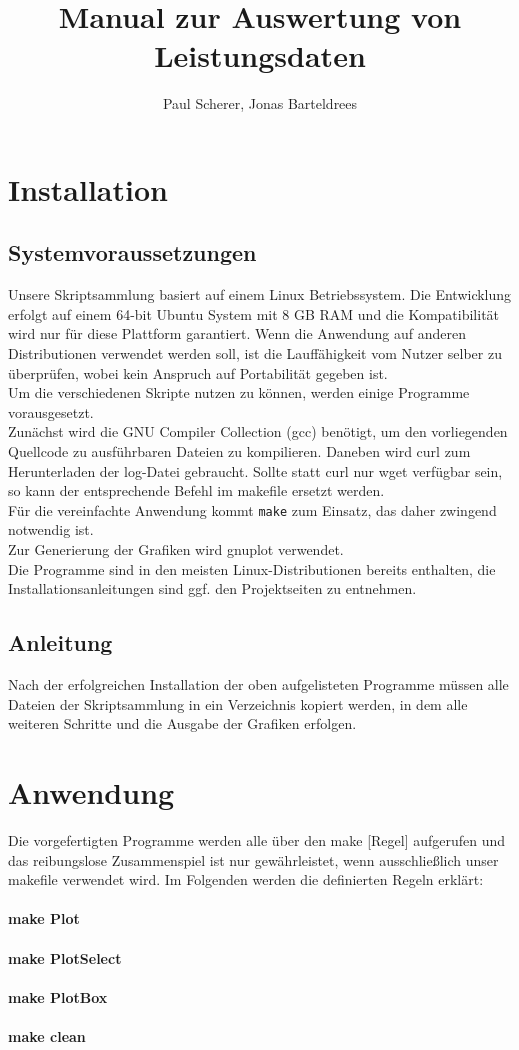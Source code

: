\documentclass[a4 paper, 12 pt]{paper}
\title{Manual zur Auswertung von Leistungsdaten}
\author{Paul Scherer, Jonas Barteldrees}
\begin{document}
\maketitle
\tableofcontents
\thispagestyle{empty}
\newpage
\setcounter{page}{1}
\section{Installation}
	\subsection{Systemvoraussetzungen}
		Unsere Skriptsammlung basiert auf einem Linux Betriebssystem. Die Entwicklung erfolgt auf einem 64-bit Ubuntu System mit 8 GB RAM und die Kompatibilität wird nur für diese Plattform garantiert. Wenn die Anwendung auf anderen Distributionen verwendet werden soll, ist die Lauffähigkeit vom Nutzer selber zu überprüfen, wobei kein Anspruch auf Portabilität gegeben ist.\\
		Um die verschiedenen Skripte nutzen zu können, werden einige Programme vorausgesetzt.\\Zunächst wird die GNU Compiler Collection (gcc) benötigt, um den vorliegenden Quellcode zu ausführbaren Dateien zu kompilieren. Daneben wird curl zum Herunterladen der log-Datei gebraucht. Sollte statt curl nur wget verfügbar sein, so kann der entsprechende Befehl im makefile ersetzt werden.\\Für die vereinfachte Anwendung kommt \verb|make| zum Einsatz, das daher zwingend notwendig ist.\\
		Zur Generierung der Grafiken wird gnuplot verwendet.\\Die Programme sind in den meisten Linux-Distributionen bereits enthalten, die Installationsanleitungen sind ggf. den Projektseiten zu entnehmen.
	\subsection{Anleitung}
		Nach der erfolgreichen Installation der oben aufgelisteten Programme müssen alle Dateien der Skriptsammlung in ein Verzeichnis kopiert werden, in dem alle weiteren Schritte und die Ausgabe der Grafiken erfolgen.
\section{Anwendung}
		Die vorgefertigten Programme werden alle über den make [Regel] aufgerufen und das reibungslose Zusammenspiel ist nur gewährleistet, wenn ausschließlich unser makefile verwendet wird. Im Folgenden werden die definierten Regeln erklärt:
	\paragraph{make Plot}
	\paragraph{make PlotSelect}
	\paragraph{make PlotBox}
	\paragraph{make clean}
\end{document}

